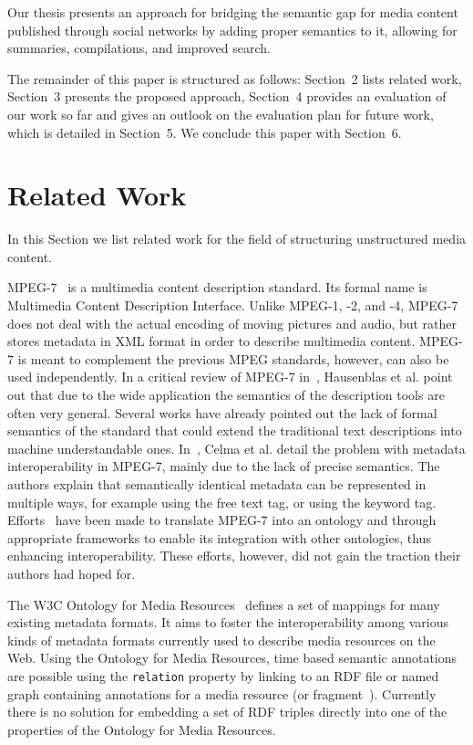 \documentclass[runningheads,a4paper]{llncs}
\begin{document}
Our thesis presents an approach for bridging the semantic gap for media content published through social networks by adding proper semantics to it, allowing for summaries, compilations, and improved search. 

The remainder of this paper is structured as follows: Section~2 lists related work, Section~3 presents the proposed approach, Section~4 provides an evaluation of our work so far and gives an outlook on the evaluation plan for future work, which is detailed in Section~5. We conclude this paper with Section~6.

\section{Related Work}
In this Section we list related work for the field of structuring unstructured media content.

MPEG-7~\cite{mpeg7} is a multimedia content description standard. Its formal name is Multimedia Content Description Interface. Unlike MPEG-1, -2, and -4, MPEG-7 does not deal with the actual encoding of moving pictures and audio, but rather stores metadata in XML format in order to describe multimedia content. MPEG-7 is meant to complement the previous MPEG standards, however, can also be used independently. In a critical review of MPEG-7 in~\cite{Hau07}, Hausenblas et al. point out that due to the wide application the semantics of the description tools are often very general. Several works have already pointed out the lack of formal semantics of the standard that could extend the traditional text descriptions into machine understandable ones. In~\cite{Celma2007}, Celma et al. detail the problem with metadata interoperability in MPEG-7, mainly due to the lack of precise semantics. The authors explain that semantically identical metadata can be represented in multiple ways, for example using the free text tag, or using the keyword tag. Efforts~\cite{garca_semantic_2005-1} have been made to translate MPEG-7 into an ontology and through appropriate frameworks to enable its integration with other ontologies, thus enhancing interoperability. These efforts, however, did not gain the traction their authors had hoped for.

The W3C Ontology for Media Resources~\cite{mediaontology} defines a set of mappings for many existing metadata formats. It aims to foster the interoperability among various kinds of metadata formats currently used to describe media resources on the Web. Using the Ontology for Media Resources, time based semantic annotations are possible using the \texttt{relation} property by linking to an RDF file or named graph containing annotations for a media resource (or fragment~\cite{W3C:MediaFrags}). Currently there is no solution for embedding a set of RDF triples directly into one of the properties of the Ontology for Media Resources.
\end{document}
